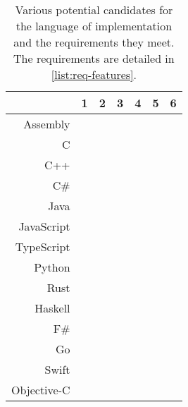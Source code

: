 \newcommand{\y}{\color{success-green}{\cmark}}
\newcommand{\n}{\color{fail-red}{\xmark}}

\begin{table}[h] 
    \centering
    \begin{tabular}{r|cccccc}
        \toprule
        & 1 & 2 & 3 & 4 & 5 & 6 \\
        \midrule
        Assembly    & \y & \n & \y & \y & \y & \y \\
        C           & \y & \y & \y & \y & \y & \y \\
        C++         & \y & \y & \y & \y & \y & \y \\
        C\#         & \y & \y & \n & \y & \y & \y \\
        Java        & \y & \y & \n & \n & \n & \n \\
        JavaScript  & \y & \n & \n & \n & \n & \n \\
        TypeScript  & \y & \y & \n & \n & \n & \n \\
        Python      & \y & \n & \n & \n & \n & \n \\
        Rust        & \y & \y & \y & \y & \y & \y \\
        Haskell     & \y & \y & \n & \y & \y & \y \\
        F\#         & \y & \y & \n & \y & \y & \y \\
        Go          & \y & \y & \n & \n & \y & \y \\
        Swift       & \n & \y & \n & \y & \y & \y \\
        Objective-C & \n & \y & \y & \y & \y & \y \\
        \bottomrule
    \end{tabular}
    \caption{Various potential candidates for the language of implementation and the requirements they meet. The requirements are detailed in \autoref{list:req-features}.}
    \label{tbl:lang-reqs}
\end{table}